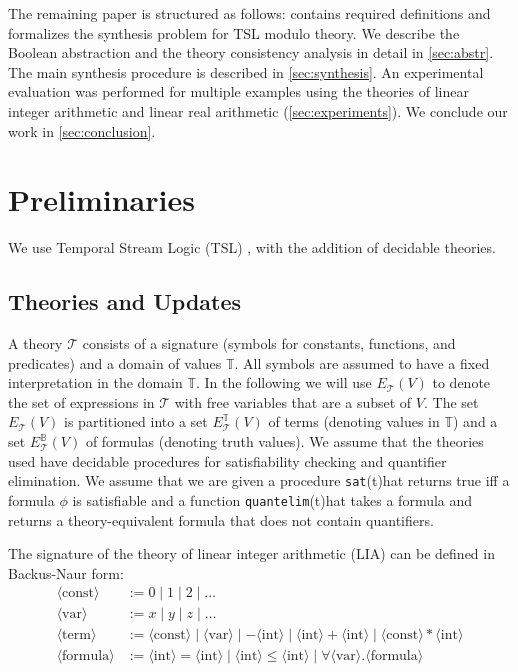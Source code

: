 \documentclass[runningheads]{llncs}
\newcommand{\theory}{\mathcal{T}}
\newcommand{\tdomain}{\mathbb{T}}
\newcommand{\quantelim}[1]{\texttt{quantelim}(#1)}
\newcommand{\sat}[1]{\texttt{sat}(#1)}
\newcommand{\nt}[1]{\langle\text{#1}\rangle}
\begin{document}
The remaining paper is structured as follows:
 contains required definitions and formalizes the synthesis problem for TSL modulo theory.
We describe the Boolean abstraction and the theory consistency analysis in detail in \cref{sec:abstr}.
The main synthesis procedure is described in \cref{sec:synthesis}.
An experimental evaluation was performed for multiple examples using the theories of linear integer arithmetic and linear real arithmetic (\cref{sec:experiments}). We conclude our work in \cref{sec:conclusion}.



\section{Preliminaries}
\label{sec:def}

We use Temporal Stream Logic (TSL) \cite{finkbeiner2019a}, with the addition of decidable theories.



\subsection{Theories and Updates}
 A theory $\mathcal{T}$ consists of a signature (symbols for constants, functions, and predicates) and a domain of values $\tdomain$. All symbols are assumed to have a fixed interpretation in the domain $\tdomain$. In the following we will use $E_\theory(V)$ to denote the set of expressions in $\theory$ with free variables that are a subset of $V$. The set $E_\theory(V)$ is partitioned into a set $E^{\tdomain}_\theory(V)$ of terms (denoting values in $\tdomain$) and a set $E^{\mathbb{B}}_\theory(V)$ of formulas (denoting truth values). 
 We assume that the theories used have decidable procedures for satisfiability checking and quantifier elimination. We assume that we are given a procedure \sat that returns true iff a formula $\phi$ is satisfiable and a function \quantelim that takes a formula and returns a theory-equivalent formula that does not contain quantifiers. 
 
\begin{example}
The signature of the theory of linear integer arithmetic (LIA) can be defined in Backus-Naur form:
\begin{align*}
    \nt{const} &:= 0 \mid 1 \mid 2 \mid \ldots\\
    \nt{var} &:= x \mid y \mid z \mid \ldots\\
    \nt{term} &:= \nt{const} \mid \nt{var} \mid - \nt{int} \mid \nt{int} + \nt{int} \mid \nt{const} * \nt{int} \\
    \nt{formula} &:= \nt{int}= \nt{int} \mid \nt{int} \leq \nt{int} \mid \forall  \nt{var}. \nt{formula}
\end{align*}

\end{example}
\end{document}
